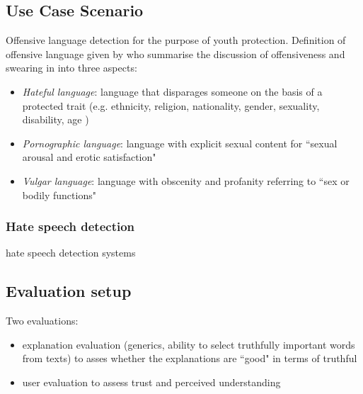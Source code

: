 \subsection{Use Case Scenario}
Offensive language detection for the purpose of youth protection.\newline
Definition of offensive language given by \cite{chen2012detecting} who summarise the discussion of offensiveness and swearing in \cite{jay2008pragmatics} into three aspects:
\begin{itemize}
	\item \textit{Hateful language}: language that disparages someone on the basis of a protected trait (e.g. ethnicity, religion, nationality, gender, sexuality, disability, age \cite{diakopoulos2016accountability})
	\item \textit{Pornographic language}: language with explicit sexual content for ``sexual arousal and erotic satisfaction" \cite{jay2008pragmatics}
	\item \textit{Vulgar language}: language with obscenity and profanity referring to ``sex or bodily functions" \cite{jay2008pragmatics}	
\end{itemize}

\subsubsection{Hate speech detection}
hate speech detection systems \newline







\subsection{Evaluation setup}

Two evaluations: 
\begin{itemize}
	\item explanation evaluation (generics, ability to select truthfully important words from texts) to asses whether the explanations are ``good" in terms of truthful
	\item user evaluation to assess trust and perceived understanding
\end{itemize}








